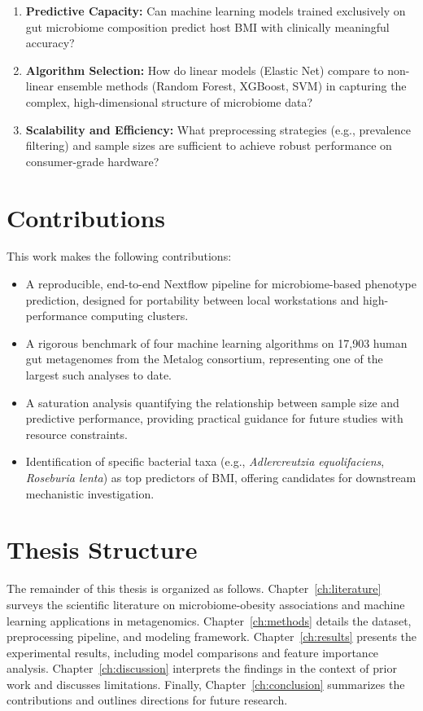 \begin{enumerate}
    \item \textbf{Predictive Capacity:} Can machine learning models trained exclusively on gut microbiome composition predict host BMI with clinically meaningful accuracy?
    \item \textbf{Algorithm Selection:} How do linear models (Elastic Net) compare to non-linear ensemble methods (Random Forest, XGBoost, SVM) in capturing the complex, high-dimensional structure of microbiome data?
    \item \textbf{Scalability and Efficiency:} What preprocessing strategies (e.g., prevalence filtering) and sample sizes are sufficient to achieve robust performance on consumer-grade hardware?
\end{enumerate}

\section{Contributions}

This work makes the following contributions:

\begin{itemize}
    \item A reproducible, end-to-end Nextflow pipeline for microbiome-based phenotype prediction, designed for portability between local workstations and high-performance computing clusters.
    \item A rigorous benchmark of four machine learning algorithms on 17,903 human gut metagenomes from the Metalog consortium, representing one of the largest such analyses to date.
    \item A saturation analysis quantifying the relationship between sample size and predictive performance, providing practical guidance for future studies with resource constraints.
    \item Identification of specific bacterial taxa (e.g., \emph{Adlercreutzia equolifaciens}, \emph{Roseburia lenta}) as top predictors of BMI, offering candidates for downstream mechanistic investigation.
\end{itemize}

\section{Thesis Structure}

The remainder of this thesis is organized as follows. Chapter~\ref{ch:literature} surveys the scientific literature on microbiome-obesity associations and machine learning applications in metagenomics. Chapter~\ref{ch:methods} details the dataset, preprocessing pipeline, and modeling framework. Chapter~\ref{ch:results} presents the experimental results, including model comparisons and feature importance analysis. Chapter~\ref{ch:discussion} interprets the findings in the context of prior work and discusses limitations. Finally, Chapter~\ref{ch:conclusion} summarizes the contributions and outlines directions for future research.
